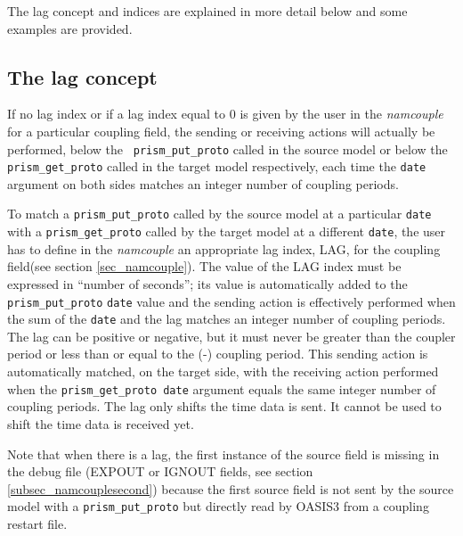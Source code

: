 The lag concept and indices are explained in more detail below and some
examples are provided.

\subsection{The lag concept}
\label{subsub_lag}

If no lag index or if a lag index equal to 0 is given by the user in
the {\it namcouple} for a particular coupling field, the sending or
receiving actions will actually be performed, below the {\tt
  prism\_put\_proto} called in the source model or below the {\tt
  prism\_get\_proto} called in the target model respectively, each time the
{\tt date} argument on both sides matches an integer number of
coupling periods.
 
\vspace*{0.5cm}

To match a {\tt prism\_put\_proto} called by the source model at a
particular {\tt date} with a {\tt prism\_get\_proto} called by the target
model at a different {\tt date}, the user has to define in the {\it
namcouple} an appropriate lag index, LAG, for the coupling field(see
section \ref{sec_namcouple}). The value of the LAG index must be
expressed in ``number of seconds''; its value is automatically added
to the {\tt prism\_put\_proto} {\tt date} value and the sending action is
effectively performed when the sum of the {\tt date} and the lag matches an
integer number of coupling periods. The lag can be positive or negative,
but it must never be greater than the coupler period or less than or
equal to the (-) coupling period.  This sending action is
automatically matched, on the target side, with the receiving action
performed when the {\tt prism\_get\_proto date} argument equals the
same integer number of coupling periods.  The lag only shifts the
time data is sent.  It cannot be used to shift the time data is
received yet.

Note that when there is a lag, the first instance of the source field
is missing in the debug file (EXPOUT or IGNOUT fields, see section
\ref{subsec_namcouplesecond}) because the first source field is not
sent by the source model with a {\tt prism\_put\_proto} but directly
read by OASIS3 from a coupling restart file.
 
